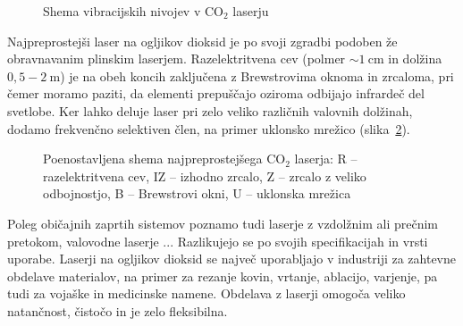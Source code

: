 \begin{figure}[h]
\centering
\def\svgwidth{95truemm} 

\caption{Shema vibracijskih nivojev v CO$_2$ laserju}
\label{fig:CO2E}
\end{figure}

Najpreprostejši laser na ogljikov dioksid  
je po svoji zgradbi podoben že obravnavanim plinskim laserjem. 
Razelektritvena cev (polmer $\sim 1~\si{\centi\metre}$ in dolžina $0,5-2~\si{\metre}$) 
je na obeh koncih zaključena z Brewstrovima oknoma in zrcaloma, pri čemer moramo paziti,
da elementi prepuščajo oziroma odbijajo infrardeč del svetlobe. Ker lahko deluje
laser pri zelo veliko različnih valovnih dolžinah, dodamo frekvenčno selektiven
člen, na primer uklonsko mrežico (slika~\ref{fig:CO2S}).

\begin{figure}[h]
\centering
\def\svgwidth{100truemm} 

\caption{Poenostavljena shema najpreprostejšega CO$_2$ laserja: R -- razelektritvena cev, 
IZ -- izhodno zrcalo, Z -- zrcalo z veliko odbojnostjo, B -- Brewstrovi okni, 
U -- uklonska mrežica
}
\label{fig:CO2S}
\end{figure}

Poleg običajnih zaprtih sistemov poznamo tudi laserje z vzdolžnim ali prečnim pretokom, 
valovodne laserje ... Razlikujejo se po svojih specifikacijah in vrsti uporabe.
Laserji na ogljikov dioksid se največ uporabljajo v industriji za zahtevne 
obdelave materialov, na primer za rezanje 
kovin, vrtanje, ablacijo, varjenje, pa tudi za vojaške in medicinske namene.
Obdelava z laserji omogoča veliko natančnost, čistočo in je zelo fleksibilna.


